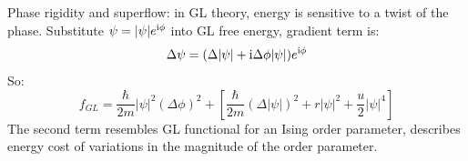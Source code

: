\documentclass[../main.tex]{subfiles}
\begin{document}
Phase rigidity and superflow: in GL theory, energy is sensitive to a twist of the phase.
Substitute \(\psi = \vert \psi \vert e^{\mathrm{i} \phi}\) into GL free energy, gradient term is:
\begin{equation}
    \Delta \psi = (\Delta \vert \psi \vert + \mathrm{i} \Delta \phi \vert \psi \vert) e^{\mathrm{i} \phi}
\end{equation}
So:
\begin{equation}
	f_{GL}  = \frac{\hbar}{2m} \vert \psi \vert^2 (\Delta \phi)^2 + \left[ \frac{\hbar}{2m} (\Delta \vert \psi \vert)^2 + r \vert \psi \vert^2 + \frac{u}{2} \vert \psi \vert^4 \right]
\end{equation}
The second term resembles GL functional for an Ising order parameter, describes energy cost of variations in the magnitude of the order parameter.

\end{document}
